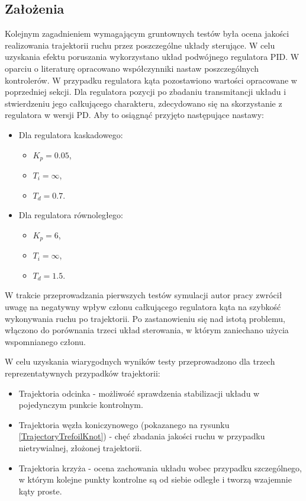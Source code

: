 \documentclass[12pt, twoside, openany]{report}
\theoremstyle{definition}
\begin{document}
\subsection{Założenia}
\label{Reqs}
Kolejnym zagadnieniem wymagającym gruntownych testów była ocena jakości realizowania trajektorii ruchu przez poszczególne układy sterujące. W celu uzyskania efektu poruszania wykorzystano układ podwójnego regulatora PID. W oparciu o literaturę opracowano współczynniki nastaw poszczególnych kontrolerów. W przypadku regulatora kąta pozostawiono wartości opracowane w poprzedniej sekcji. Dla regulatora pozycji po zbadaniu transmitancji układu i stwierdzeniu jego całkującego charakteru, zdecydowano się na skorzystanie z regulatora w wersji PD. Aby to osiągnąć przyjęto następujące nastawy:
\begin{itemize}
\item Dla regulatora kaskadowego:
\begin{itemize}
\item $K_p = 0.05$,
\item $T_i = \infty$,
\item $T_d = 0.7$.
\end{itemize}
\item Dla regulatora równoległego:
\begin{itemize}
\item $K_p = 6$,
\item $T_i = \infty$,
\item $T_d = 1.5$.
\end{itemize}
\end{itemize}

W trakcie przeprowadzania pierwszych testów symulacji autor pracy zwrócił uwagę na negatywny wpływ członu całkującego regulatora kąta na szybkość wykonywania ruchu po trajektorii. Po zastanowieniu się nad istotą problemu, włączono do porównania trzeci układ sterowania, w którym zaniechano użycia wspomnianego członu.


W celu uzyskania wiarygodnych wyników testy przeprowadzono dla trzech reprezentatywnych przypadków trajektorii:
\begin{itemize}
\item Trajektoria odcinka - możliwość sprawdzenia stabilizacji układu w pojedynczym punkcie kontrolnym.
\item Trajektoria węzła koniczynowego (pokazanego na rysunku \ref{TrajectoryTrefoilKnot}) - chęć zbadania jakości ruchu w przypadku nietrywialnej, złożonej trajektorii.
\item Trajektoria krzyża - ocena zachowania układu wobec przypadku szczególnego, w którym kolejne punkty kontrolne są od siebie odległe i tworzą wzajemnie kąty proste.
\end{itemize}
\end{document}
